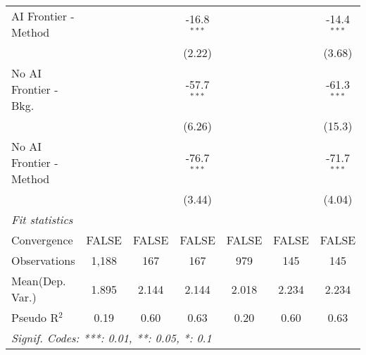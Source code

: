 \begin{tabular}{lcccccc}
   AI Frontier - Method    &        &               & -16.8$^{***}$ &        &               & -14.4$^{***}$\\   
                           &        &               & (2.22)        &        &               & (3.68)\\   
   No AI Frontier - Bkg.   &        &               & -57.7$^{***}$ &        &               & -61.3$^{***}$\\   
                           &        &               & (6.26)        &        &               & (15.3)\\   
   No AI Frontier - Method &        &               & -76.7$^{***}$ &        &               & -71.7$^{***}$\\   
                           &        &               & (3.44)        &        &               & (4.04)\\   
   \midrule
   \emph{Fit statistics}\\
   Convergence             &FALSE   & FALSE         & FALSE         & FALSE  & FALSE         & FALSE\\  
   Observations            & 1,188  & 167           & 167           & 979    & 145           & 145\\  
Mean(Dep. Var.) & 1.895 & 2.144 & 2.144 & 2.018 & 2.234 & 2.234 \\
   Pseudo R$^2$            & 0.19   & 0.60          & 0.63          & 0.20   & 0.60          & 0.63\\  
   \midrule \midrule
   \multicolumn{7}{l}{\emph{Signif. Codes: ***: 0.01, **: 0.05, *: 0.1}}\\
\end{tabular}
\par\endgroup

